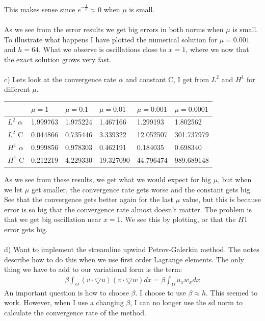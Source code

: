 \documentclass[11pt,a4paper]{report}
\begin{document}
This makes sense since $e^{-\frac{1}{\mu}} \approx 0 $ when $\mu$ is small.
\\
\\
As we see from the error results we get big errors in both norms when $\mu$ is small. To illustrate what happens I have plotted the numerical solution for $\mu=0.001$ and $h=64$. What we observe is oscillations close to $x=1$, where we now that the exact solution grows very fast.
\\
\\
c) Lets look at the convergence rate $\alpha$ and constant C, I get from $L^2$ and $H^1$ for different $\mu$.
\begin{center}
    \begin{tabular}{| l | l | l | l | l | l |}
    \hline
     & $\mu=1$ & $\mu=0.1$ & $\mu=0.01$ & $\mu=0.001$ & $\mu=0.0001$ \\ \hline
    $L^2$ $\alpha$ &  1.999763 & 1.975224 & 1.467166 & 1.299193& 1.802562\\ \hline
    $L^2$ C & 0.044866&  0.735446 &3.339322& 12.052507&301.737979\\ \hline
    $H^1$ $\alpha$ & 0.999856 &  0.978303 & 0.462191	& 0.184035& 0.698340\\ \hline
    $H^1$ C & 0.212219 &  4.229330 & 19.327090	& 44.796474&989.689148 \\ \hline
    \end{tabular}
\end{center}
As we see from these results, we get what we would expect for big $\mu$, but when we let $\mu$ get smaller, the convergence rate gets worse and the constant gets big. See that the convergence gets better again for the last $\mu$ value, but this is because error is so big that the convergence rate almost doesn't matter. The problem is that we get big oscillation near $x=1$. We see this by plotting, or that the $H1$ error gets big.
\\
\\
d) Want to implement the streamline upwind Petrov-Galerkin method. The notes describe how to do this when we use first order Lagrange elements. The only thing we have to add to our variational form is the term: 
\begin{align*}
\beta \int_{\Omega} (v\cdot \bigtriangledown u)(v\cdot \bigtriangledown w)dx = \beta\int_{\Omega} u_xw_xdx
\end{align*}
An important question is how to choose $\beta$. I choose to use $\beta \approx h$. This seemed to work. However, when I use a changing $\beta$, I can no longer use the sd norm to calculate the convergence rate of the method.
\end{document}
